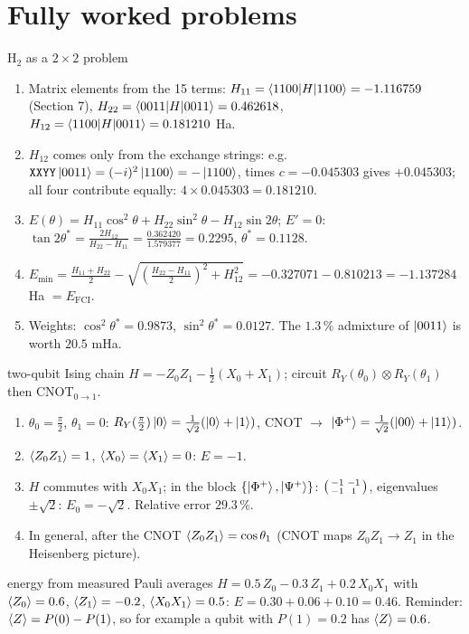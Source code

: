 \documentclass[11pt,a4paper,openany]{book}
\newcounter{wex}[chapter]
\newenvironment{steps}{\begin{enumerate}[label=\textbf{Step \arabic*.}, leftmargin=4.2em, itemsep=2pt]}{\end{enumerate}}
\begin{document}
\section{Fully worked problems}
\begin{wexample}{H$_2$ as a $2\times2$ problem}
\begin{steps}
\item Matrix elements from the 15 terms: $H_{11} = \braket{1100|H|1100} = -1.116759$ (Section 7), $H_{22} = \braket{0011|H|0011} = 0.462618$,
$H_{12} = \braket{1100|H|0011} = 0.181210$ Ha.
\item $H_{12}$ comes only from the exchange strings: e.g.\ $\texttt{XXYY}\ket{0011} = (-i)^2\ket{1100} = -\ket{1100}$, times $c = -0.045303$ gives $+0.045303$; all four
contribute equally: $4\times0.045303 = 0.181210$.
\item $E(\theta) = H_{11}\cos^2\theta + H_{22}\sin^2\theta - H_{12}\sin2\theta$; $E' = 0$: $\tan2\theta^* = \frac{2H_{12}}{H_{22} - H_{11}} = \frac{0.362420}{1.579377} = 0.2295$, $\theta^* = 0.1128$.
\item $E_{\min} = \frac{H_{11} + H_{22}}{2} - \sqrt{\left(\frac{H_{22} - H_{11}}{2}\right)^2 + H_{12}^2} = -0.327071 - 0.810213 = -1.137284$ Ha $= E_{\mathrm{FCI}}$.
\item Weights: $\cos^2\theta^* = 0.9873$, $\sin^2\theta^* = 0.0127$. The $1.3\,\%$ admixture of $\ket{0011}$ is worth $20.5$ mHa.
\end{steps}
\end{wexample}
\begin{wexample}{two-qubit Ising chain}
$H = -Z_0Z_1 - \tfrac12(X_0 + X_1)$; circuit $R_Y(\theta_0)\otimes R_Y(\theta_1)$ then CNOT$_{0\to1}$.
\begin{steps}
\item $\theta_0 = \frac\pi2$, $\theta_1 = 0$: $R_Y(\frac\pi2)\ket0 = \frac{1}{\sqrt2}(\ket0 + \ket1)$, CNOT $\to$ $\ket{\Phi^+} = \frac{1}{\sqrt2}(\ket{00} + \ket{11})$.
\item $\braket{Z_0Z_1} = 1$, $\braket{X_0} = \braket{X_1} = 0$: $E = -1$.
\item $H$ commutes with $X_0X_1$; in the block $\{\ket{\Phi^+}, \ket{\Psi^+}\}$: $\begin{psmallmatrix}-1&-1\\-1&1\end{psmallmatrix}$, eigenvalues $\pm\sqrt2$: $E_0 = -\sqrt2$. Relative error $29.3\,\%$.
\item In general, after the CNOT $\braket{Z_0Z_1} = \cos\theta_1$ (CNOT maps $Z_0Z_1 \to Z_1$ in the Heisenberg picture).
\end{steps}
\end{wexample}
\begin{wexample}{energy from measured Pauli averages}
$H = 0.5\,Z_0 - 0.3\,Z_1 + 0.2\,X_0X_1$ with $\braket{Z_0} = 0.6$, $\braket{Z_1} = -0.2$, $\braket{X_0X_1} = 0.5$: $E = 0.30 + 0.06 + 0.10 = 0.46$.
Reminder: $\braket{Z} = P(0) - P(1)$, so for example a qubit with $P(1) = 0.2$ has $\braket{Z} = 0.6$.
\end{wexample}
\end{document}
